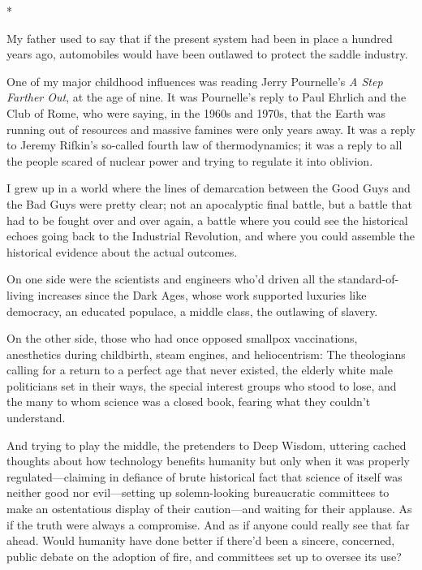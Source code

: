 {\centering
 *
\par}


{
 My father used to say that if the present system had been in place
a hundred years ago, automobiles would have been outlawed to protect
the saddle industry. }

{
 One of my major childhood influences was reading Jerry
Pournelle's \textit{A Step Farther Out}, at the age of
nine. It was Pournelle's reply to Paul Ehrlich and the
Club of Rome, who were saying, in the 1960s and 1970s, that the Earth
was running out of resources and massive famines were only years away.
It was a reply to Jeremy Rifkin's so-called fourth law
of thermodynamics; it was a reply to all the people scared of nuclear
power and trying to regulate it into oblivion.}

{
 I grew up in a world where the lines of demarcation between the
Good Guys and the Bad Guys were pretty clear; not an apocalyptic final
battle, but a battle that had to be fought over and over again, a
battle where you could see the historical echoes going back to the
Industrial Revolution, and where you could assemble the historical
evidence about the actual outcomes.}

{
 On one side were the scientists and engineers
who'd driven all the standard-of-living increases since
the Dark Ages, whose work supported luxuries like democracy, an
educated populace, a middle class, the outlawing of slavery.}

{
 On the other side, those who had once opposed smallpox
vaccinations, anesthetics during childbirth, steam engines, and
heliocentrism: The theologians calling for a return to a perfect age
that never existed, the elderly white male politicians set in their
ways, the special interest groups who stood to lose, and the many to
whom science was a closed book, fearing what they
couldn't understand.}

{
 And trying to play the middle, the pretenders to Deep Wisdom,
uttering cached thoughts about how technology benefits humanity but
only when it was properly regulated---claiming in defiance of brute
historical fact that science of itself was neither good nor
evil---setting up solemn-looking bureaucratic committees to make an
ostentatious display of their caution---and waiting for their applause.
As if the truth were always a compromise. And as if anyone could really
see that far ahead. Would humanity have done better if
there'd been a sincere, concerned, public debate on the
adoption of fire, and committees set up to oversee its use?}

